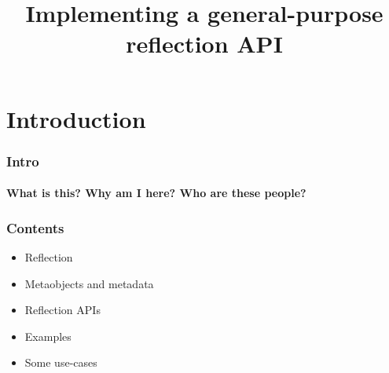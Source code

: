 \documentclass[compress,table,xcolor=table]{beamer}
\begin{document}
\title{Implementing a general-purpose reflection API}
\section{Introduction}
\begin{frame}
  \frametitle{Intro}
  \framesubtitle{What is this? Why am I here? Who are these people?}
\end{frame}
\begin{frame}
  \frametitle{Contents}
  \Large
  \begin{itemize}
    \item Reflection
    \item Metaobjects and metadata
    \item Reflection APIs
    \item Examples
    \item Some use-cases
  \end{itemize}
\end{frame}
\end{document}
